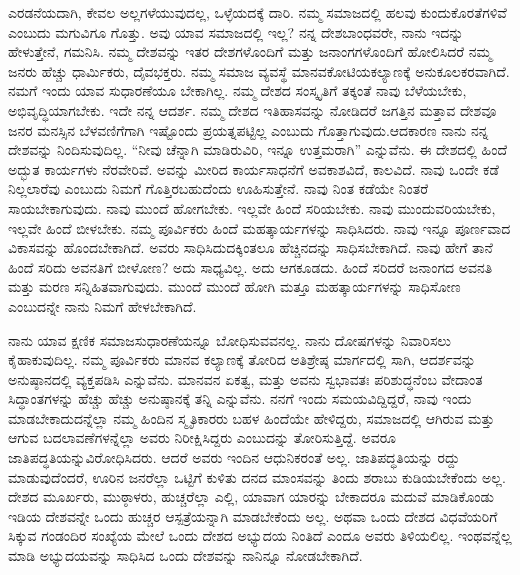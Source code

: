 ಎರಡನೆಯದಾಗಿ, ಕೇವಲ ಅಲ್ಲಗಳೆಯುವುದಲ್ಲ, ಒಳ್ಳೆಯದಕ್ಕೆ ದಾರಿ. ನಮ್ಮ ಸಮಾಜದಲ್ಲಿ ಹಲವು ಕುಂದುಕೊರತೆಗಳಿವೆ ಎಂಬುದು ಮಗುವಿಗೂ ಗೊತ್ತು. ಅವು ಯಾವ ಸಮಾಜದಲ್ಲಿ ಇಲ್ಲ? ನನ್ನ ದೇಶಬಾಂಧವರೇ, ನಾನು ಇದನ್ನು ಹೇಳುತ್ತೇನೆ, ಗಮನಿಸಿ. ನಮ್ಮ ದೇಶವನ್ನು ಇತರ ದೇಶಗಳೊಂದಿಗೆ ಮತ್ತು ಜನಾಂಗಗಳೊಂದಿಗೆ ಹೋಲಿಸಿದರೆ ನಮ್ಮ ಜನರು ಹೆಚ್ಚು ಧಾರ್ಮಿಕರು, ದೈವಭಕ್ತರು. ನಮ್ಮ ಸಮಾಜ ವ್ಯವಸ್ಥೆ ಮಾನವಕೋಟಿಯ\break ಕಲ್ಯಾಣಕ್ಕೆ ಅನುಕೂಲಕರವಾಗಿದೆ. ನಮಗೆ ಇಂದು ಯಾವ ಸುಧಾರಣೆಯೂ ಬೇಕಾಗಿಲ್ಲ. ನಮ್ಮ ದೇಶದ ಸಂಸ್ಕೃತಿಗೆ ತಕ್ಕಂತೆ ನಾವು ಬೆಳೆಯಬೇಕು, ಅಭಿವೃದ್ಧಿಯಾಗಬೇಕು. ಇದೇ ನನ್ನ ಆದರ್ಶ. ನಮ್ಮ ದೇಶದ ಇತಿಹಾಸವನ್ನು ನೋಡಿದರೆ ಜಗತ್ತಿನ ಮತ್ತಾವ ದೇಶವೂ ಜನರ ಮನಸ್ಸಿನ ಬೆಳವಣಿಗೆಗಾಗಿ ಇಷ್ಟೊಂದು ಪ್ರಯತ್ನಪಟ್ಟಿಲ್ಲ ಎಂಬುದು ಗೊತ್ತಾಗುವುದು.\break ಆದಕಾರಣ ನಾನು ನನ್ನ ದೇಶವನ್ನು ನಿಂದಿಸುವುದಿಲ್ಲ. ``ನೀವು ಚೆನ್ನಾಗಿ ಮಾಡಿರುವಿರಿ, ಇನ್ನೂ ಉತ್ತಮರಾಗಿ” ಎನ್ನುವೆನು. ಈ ದೇಶದಲ್ಲಿ ಹಿಂದೆ ಅದ್ಭುತ ಕಾರ್ಯಗಳು ನೆರವೇರಿವೆ. ಅವನ್ನು ಮೀರಿದ ಕಾರ್ಯಸಾಧನೆಗೆ ಅವಕಾಶವಿದೆ, ಕಾಲವಿದೆ. ನಾವು ಒಂದೇ ಕಡೆ ನಿಲ್ಲಲಾರೆವು ಎಂಬುದು ನಿಮಗೆ ಗೊತ್ತಿರಬಹುದೆಂದು ಊಹಿಸುತ್ತೇನೆ. ನಾವು ನಿಂತ ಕಡೆಯೇ ನಿಂತರೆ ಸಾಯಬೇಕಾಗುವುದು. ನಾವು ಮುಂದೆ ಹೋಗಬೇಕು. ಇಲ್ಲವೇ ಹಿಂದೆ ಸರಿಯಬೇಕು. ನಾವು ಮುಂದುವರಿಯಬೇಕು, ಇಲ್ಲವೇ ಹಿಂದೆ ಬೀಳಬೇಕು. ನಮ್ಮ ಪೂರ್ವಿಕರು ಹಿಂದೆ ಮಹತ್ಕಾರ್ಯಗಳನ್ನು ಸಾಧಿಸಿದರು. ನಾವು ಇನ್ನೂ ಪೂರ್ಣವಾದ ವಿಕಾಸವನ್ನು ಹೊಂದಬೇಕಾಗಿದೆ. ಅವರು ಸಾಧಿಸಿದುದಕ್ಕಿಂತಲೂ ಹೆಚ್ಚಿನದನ್ನು ಸಾಧಿಸಬೇಕಾಗಿದೆ. ನಾವು ಹೇಗೆ ತಾನೆ ಹಿಂದೆ ಸರಿದು ಅವನತಿಗೆ ಬೀಳೋಣ? ಅದು ಸಾಧ್ಯವಿಲ್ಲ. ಅದು ಆಗಕೂಡದು. ಹಿಂದೆ ಸರಿದರೆ ಜನಾಂಗದ ಅವನತಿ ಮತ್ತು ಮರಣ ಸನ್ನಿಹಿತವಾಗುವುದು. ಮುಂದೆ ಮುಂದೆ ಹೋಗಿ ಮತ್ತೂ ಮಹತ್ಕಾರ್ಯಗಳನ್ನು ಸಾಧಿಸೋಣ ಎಂಬುದನ್ನೇ ನಾನು ನಿಮಗೆ ಹೇಳಬೇಕಾಗಿದೆ.

\vskip 0.2cm

ನಾನು ಯಾವ ಕ್ಷಣಿಕ ಸಮಾಜಸುಧಾರಣೆಯನ್ನೂ ಬೋಧಿಸುವವನಲ್ಲ. ನಾನು ದೋಷಗಳನ್ನು ನಿವಾರಿಸಲು ಕೈಹಾಕುವುದಿಲ್ಲ. ನಮ್ಮ ಪೂರ್ವಿಕರು ಮಾನವ ಕಲ್ಯಾಣಕ್ಕೆ ತೋರಿದ ಅತಿಶ್ರೇಷ್ಠ ಮಾರ್ಗದಲ್ಲಿ ಸಾಗಿ, ಆದರ್ಶವನ್ನು ಅನುಷ್ಠಾನದಲ್ಲಿ ವ್ಯಕ್ತಪಡಿಸಿ ಎನ್ನುವೆನು. ಮಾನವನ ಏಕತ್ವ, ಮತ್ತು ಅವನು ಸ್ವಭಾವತಃ ಪರಿಶುದ್ಧನೆಂಬ ವೇದಾಂತ ಸಿದ್ಧಾಂತಗಳನ್ನು ಹೆಚ್ಚು ಹೆಚ್ಚು ಅನುಷ್ಠಾನಕ್ಕೆ ತನ್ನಿ ಎನ್ನುವೆನು. ನನಗೆ ಇಂದು ಸಮಯವಿದ್ದಿದ್ದರೆ, ನಾವು ಇಂದು ಮಾಡಬೇಕಾದುದನ್ನೆಲ್ಲಾ ನಮ್ಮ ಹಿಂದಿನ ಸ್ಮೃತಿಕಾರರು ಬಹಳ ಹಿಂದೆಯೇ ಹೇಳಿದ್ದರು, ಸಮಾಜದಲ್ಲಿ ಆಗಿರುವ ಮತ್ತು ಆಗುವ ಬದಲಾವಣೆಗಳನ್ನೆಲ್ಲಾ ಅವರು ನಿರೀಕ್ಷಿಸಿದ್ದರು ಎಂಬುದನ್ನು ತೋರಿಸುತ್ತಿದ್ದೆ. ಅವರೂ ಜಾತಿಪದ್ಧತಿಯನ್ನು\break ವಿರೋಧಿಸಿದರು. ಆದರೆ ಅವರು ಇಂದಿನ ಆಧುನಿಕರಂತೆ ಅಲ್ಲ. ಜಾತಿಪದ್ಧತಿಯನ್ನು ರದ್ದು ಮಾಡುವುದೆಂದರೆ, ಊರಿನ ಜನರೆಲ್ಲಾ ಒಟ್ಟಿಗೆ ಕುಳಿತು ದನದ ಮಾಂಸವನ್ನು ತಿಂದು ಶರಾಬು ಕುಡಿಯಬೇಕೆಂದು ಅಲ್ಲ. ದೇಶದ ಮೂರ್ಖರು, ಮುಠ್ಠಾಳರು, ಹುಚ್ಚರೆಲ್ಲಾ ಎಲ್ಲಿ, ಯಾವಾಗ ಯಾರನ್ನು ಬೇಕಾದರೂ ಮದುವೆ ಮಾಡಿಕೊಂಡು ಇಡಿಯ ದೇಶವನ್ನೇ ಒಂದು ಹುಚ್ಚರ ಆಸ್ಪತ್ರೆಯನ್ನಾಗಿ ಮಾಡಬೇಕೆಂದು ಅಲ್ಲ. ಅಥವಾ ಒಂದು ದೇಶದ ವಿಧವೆಯರಿಗೆ ಸಿಕ್ಕುವ ಗಂಡಂದಿರ ಸಂಖ್ಯೆಯ ಮೇಲೆ ಒಂದು ದೇಶದ ಅಭ್ಯುದಯ ನಿಂತಿದೆ ಎಂದೂ ಅವರು ತಿಳಿಯಲಿಲ್ಲ. ಇಂಥವನ್ನೆಲ್ಲ ಮಾಡಿ ಅಭ್ಯುದಯವನ್ನು ಸಾಧಿಸಿದ ಒಂದು ದೇಶವನ್ನು ನಾನಿನ್ನೂ ನೋಡಬೇಕಾಗಿದೆ.

\vskip 0.2cm

